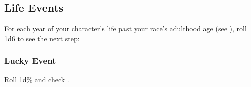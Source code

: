 \subsection{Life Events}
For each year of your character's life past your race's adulthood age (see ), roll 1d6 to see the next step:


\clearpage
\subsubsection{Lucky Event}
Roll 1d\% and check .


